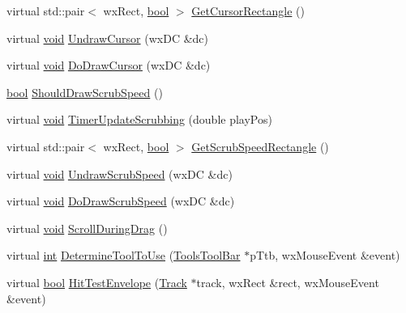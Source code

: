 \begin{DoxyCompactItemize}
virtual std\+::pair$<$ wx\+Rect, \hyperlink{mac_2config_2i386_2lib-src_2libsoxr_2soxr-config_8h_abb452686968e48b67397da5f97445f5b}{bool} $>$ \hyperlink{class_track_panel_a8e37a1fde074f6a21b55ec239214a9a6}{Get\+Cursor\+Rectangle} ()
\item 
virtual \hyperlink{sound_8c_ae35f5844602719cf66324f4de2a658b3}{void} \hyperlink{class_track_panel_ab20a415139f6edd83cb0d19b74878a8b}{Undraw\+Cursor} (wx\+DC \&dc)
\item 
virtual \hyperlink{sound_8c_ae35f5844602719cf66324f4de2a658b3}{void} \hyperlink{class_track_panel_aff33f2fa5cda0ffb92a1dd41758e418c}{Do\+Draw\+Cursor} (wx\+DC \&dc)
\item 
\hyperlink{mac_2config_2i386_2lib-src_2libsoxr_2soxr-config_8h_abb452686968e48b67397da5f97445f5b}{bool} \hyperlink{class_track_panel_a0f4818c686417ac1884da573c6acc9e3}{Should\+Draw\+Scrub\+Speed} ()
\item 
virtual \hyperlink{sound_8c_ae35f5844602719cf66324f4de2a658b3}{void} \hyperlink{class_track_panel_a4c24a3389932e326341a16bfeec01242}{Timer\+Update\+Scrubbing} (double play\+Pos)
\item 
virtual std\+::pair$<$ wx\+Rect, \hyperlink{mac_2config_2i386_2lib-src_2libsoxr_2soxr-config_8h_abb452686968e48b67397da5f97445f5b}{bool} $>$ \hyperlink{class_track_panel_ab5d6cd70214d951298e021b2495ee3e3}{Get\+Scrub\+Speed\+Rectangle} ()
\item 
virtual \hyperlink{sound_8c_ae35f5844602719cf66324f4de2a658b3}{void} \hyperlink{class_track_panel_a091f967bc3c2366364e48b41b21e40c3}{Undraw\+Scrub\+Speed} (wx\+DC \&dc)
\item 
virtual \hyperlink{sound_8c_ae35f5844602719cf66324f4de2a658b3}{void} \hyperlink{class_track_panel_aa8e9d595a7f1d370f8d5a55cd4e65045}{Do\+Draw\+Scrub\+Speed} (wx\+DC \&dc)
\item 
virtual \hyperlink{sound_8c_ae35f5844602719cf66324f4de2a658b3}{void} \hyperlink{class_track_panel_a8d0d7d27b645b0ca5bbc393fd83a0098}{Scroll\+During\+Drag} ()
\item 
virtual \hyperlink{xmltok_8h_a5a0d4a5641ce434f1d23533f2b2e6653}{int} \hyperlink{class_track_panel_ae5f00fa573c7c333e78da8fbd5e9c03f}{Determine\+Tool\+To\+Use} (\hyperlink{class_tools_tool_bar}{Tools\+Tool\+Bar} $\ast$p\+Ttb, wx\+Mouse\+Event \&event)
\item 
virtual \hyperlink{mac_2config_2i386_2lib-src_2libsoxr_2soxr-config_8h_abb452686968e48b67397da5f97445f5b}{bool} \hyperlink{class_track_panel_ad6a29c53e444aa79c26a8b6667f21031}{Hit\+Test\+Envelope} (\hyperlink{class_track}{Track} $\ast$track, wx\+Rect \&rect, wx\+Mouse\+Event \&event)

\end{DoxyCompactItemize}
